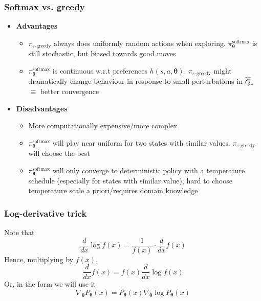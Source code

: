 \documentclass[10pt,a4paper]{beamer}
\newcommand{\bth}{{\boldsymbol{\theta}}}
\begin{document}
\begin{frame}
	\frametitle{Softmax vs. greedy}
	\begin{itemize}
			\item \textbf{Advantages}
			\begin{itemize}
					\item $\pi_{\varepsilon\text{-greedy}}$ always does uniformly random actions when exploring.
						$\pi^{\text{softmax}}_\bth$ is still stochastic, but biased towards good moves
					\item $\pi^{\text{softmax}}_\bth$ is continuous w.r.t preferences $h(s,a,\bth)$.  $\pi_{\varepsilon\text{-greedy}}$ might dramatically change
					behaviour in response to small perturbations in $\hat{Q}_*$ $\equiv$ better
					convergence
				\end{itemize}
			\item \textbf{Disadvantages}
			\begin{itemize}
					\item More computationally expensive/more complex
					\item $\pi^{\text{softmax}}_\bth$ will play near uniform for
					two states with similar values. $\pi_{\varepsilon\text{-greedy}}$ will
					choose the best 
					\item $\pi^{\text{softmax}}_\bth$ will only converge to deterministic policy
					with a temperature schedule (especially for states with similar value), 
					hard to choose temperature scale a priori/requires domain knowledge
				\end{itemize}
		\end{itemize}
\end{frame}

\begin{frame}
	\frametitle{Log-derivative trick}
	Note that 
	$$
	\frac{d}{dx} \log f(x) = \frac{1}{f(x)} \cdot \frac{d}{dx} f(x)
	$$
	Hence, multiplying by $f(x)$,
	$$
	\frac{d}{dx} f(x) = f(x) \frac{d}{dx} \log f(x)
	$$
	Or, in the form we will use it
	$$
	\nabla_\bth P_\bth(x) = P_\bth(x) \nabla_\bth \log P_\bth(x)
	$$
\end{frame}
\end{document}
